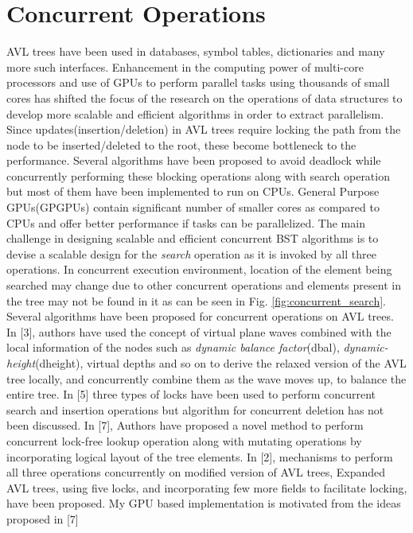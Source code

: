 \documentclass[MTech]{iitmdiss}
\begin{document}
\chapter{Concurrent Operations}
\label{chap:concurrent}
AVL trees have been used in databases, symbol tables, dictionaries and many more such interfaces. Enhancement in the computing power of multi-core processors and use of GPUs to perform parallel tasks using thousands of small cores has shifted the focus of the research on the operations of data structures to develop more scalable and efficient algorithms in order to extract parallelism. Since updates(insertion/deletion) in AVL trees require locking the path from the node to be inserted/deleted to the root, these become bottleneck to the performance. Several algorithms have been proposed to avoid deadlock while concurrently performing these blocking operations along with search operation but most of them have been implemented to run on CPUs. General Purpose GPUs(GPGPUs) contain significant number of smaller cores as compared to CPUs and offer better performance if tasks can be parallelized. The main challenge in designing scalable and efficient concurrent BST algorithms is to devise a scalable design for the \textit{search} operation as it is invoked by all three operations. In concurrent execution environment, location of the element being searched may change due to other concurrent operations and elements present in the tree may not be found in it as can be seen in Fig. \ref{fig:concurrent_search}. \\ 
\indent Several algorithms have been proposed for concurrent operations on AVL trees. In [3], authors have used the concept of virtual plane waves combined with the local information of the nodes such as \textit{dynamic balance factor}(dbal), \textit{dynamic-height}(dheight), virtual depths and so on to derive the relaxed version of the AVL tree locally, and concurrently combine them as the wave moves up, to balance the entire tree. In [5] three types of locks have been used to perform concurrent search and insertion operations but algorithm for concurrent deletion has not been discussed. In [7], Authors have proposed a novel method to perform concurrent lock-free lookup operation along with mutating operations by incorporating logical layout of the tree elements. In [2], mechanisms to perform all three operations  concurrently on modified version of AVL trees, Expanded AVL trees, using five locks, and incorporating few more fields to facilitate locking, have been proposed. My GPU based implementation is motivated from the ideas proposed in [7]
\end{document}
